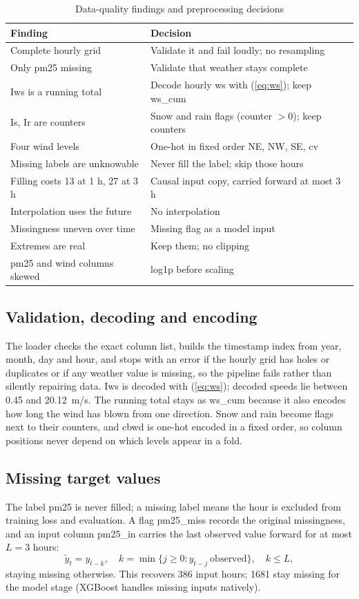 \documentclass[conference]{IEEEtran}
\begin{document}
\begin{table}[!htb]
\centering
\caption{Data-quality findings and preprocessing decisions}
\label{tab:prep}
\begin{tabular}{@{}p{}p{}@{}}
\toprule
Finding & Decision \\
\midrule
Complete hourly grid & Validate it and fail loudly; no resampling \\
Only pm25 missing & Validate that weather stays complete \\
Iws is a running total & Decode hourly ws with (\ref{eq:ws}); keep ws\_cum \\
Is, Ir are counters & Snow and rain flags (counter $>0$); keep counters \\
Four wind levels & One-hot in fixed order NE, NW, SE, cv \\
Missing labels are unknowable & Never fill the label; skip those hours \\
Filling costs 13 at 1 h, 27 at 3 h & Causal input copy, carried forward at most 3 h \\
Interpolation uses the future & No interpolation \\
Missingness uneven over time & Missing flag as a model input \\
Extremes are real & Keep them; no clipping \\
pm25 and wind columns skewed & log1p before scaling \\
\bottomrule
\end{tabular}
\end{table}

\subsection{Validation, decoding and encoding}
The loader checks the exact column list, builds the timestamp index from year, month, day and hour, and stops with an error if the hourly grid has holes or duplicates or if any weather value is missing, so the pipeline fails rather than silently repairing data. Iws is decoded with (\ref{eq:ws}); decoded speeds lie between 0.45 and 20.12~m/s. The running total stays as ws\_cum because it also encodes how long the wind has blown from one direction. Snow and rain become flags next to their counters, and cbwd is one-hot encoded in a fixed order, so column positions never depend on which levels appear in a fold.

\subsection{Missing target values}
The label pm25 is never filled; a missing label means the hour is excluded from training loss and evaluation. A flag pm25\_miss records the original missingness, and an input column pm25\_in carries the last observed value forward for at most $L=3$ hours:
\begin{equation}
\tilde{y}_t = y_{t-k}, \quad k = \min\{j \ge 0 : y_{t-j}\ \text{observed}\}, \quad k \le L,
\end{equation}
staying missing otherwise. This recovers 386 input hours; \num{1681} stay missing for the model stage (XGBoost handles missing inputs natively).
\end{document}
